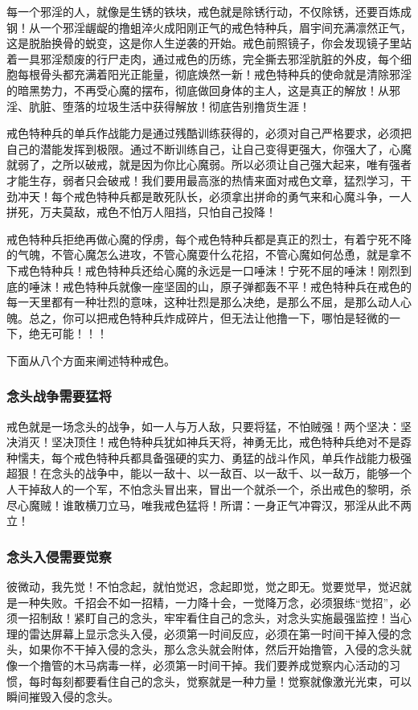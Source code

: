 每一个邪淫的人，就像是生锈的铁块，戒色就是除锈行动，不仅除锈，还要百炼成钢！从一个邪淫龌龊的撸蛆淬火成阳刚正气的戒色特种兵，眉宇间充满凛然正气，这是脱胎换骨的蜕变，这是你人生逆袭的开始。戒色前照镜子，你会发现镜子里站着一具邪淫颓废的行尸走肉，通过戒色的历练，完全撕去邪淫肮脏的外皮，每个细胞每根骨头都充满着阳光正能量，彻底焕然一新！戒色特种兵的使命就是清除邪淫的暗黑势力，不再受心魔的摆布，彻底做回身体的主人，这是真正的解放！从邪淫、肮脏、堕落的垃圾生活中获得解放！彻底告别撸货生涯！

戒色特种兵的单兵作战能力是通过残酷训练获得的，必须对自己严格要求，必须把自己的潜能发挥到极限。通过不断训练自己，让自己变得更强大，你强大了，心魔就弱了，之所以破戒，就是因为你比心魔弱。所以必须让自己强大起来，唯有强者才能生存，弱者只会破戒！我们要用最高涨的热情来面对戒色文章，猛烈学习，干劲冲天！每个戒色特种兵都是敢死队长，必须拿出拼命的勇气来和心魔斗争，一人拼死，万夫莫敌，戒色不怕万人阻挡，只怕自己投降！

戒色特种兵拒绝再做心魔的俘虏，每个戒色特种兵都是真正的烈士，有着宁死不降的气魄，不管心魔怎么进攻，不管心魔耍什么花招，不管心魔如何怂恿，就是拿不下戒色特种兵！戒色特种兵还给心魔的永远是一口唾沫！宁死不屈的唾沫！刚烈到底的唾沫！戒色特种兵就像一座坚固的山，原子弹都轰不平！戒色特种兵在戒色的每一天里都有一种壮烈的意味，这种壮烈是那么决绝，是那么不屈，是那么动人心魄。总之，你可以把戒色特种兵炸成碎片，但无法让他撸一下，哪怕是轻微的一下，绝无可能！！！

下面从八个方面来阐述特种戒色。

\subsubsection{念头战争需要猛将}

戒色就是一场念头的战争，如一人与万人敌，只要将猛，不怕贼强！两个坚决：坚决消灭！坚决顶住！戒色特种兵犹如神兵天将，神勇无比，戒色特种兵绝对不是孬种懦夫，每个戒色特种兵都具备强硬的实力、勇猛的战斗作风，单兵作战能力极强超狠！在念头的战争中，能以一敌十、以一敌百、以一敌千、以一敌万，能够一个人干掉敌人的一个军，不怕念头冒出来，冒出一个就杀一个，杀出戒色的黎明，杀尽心魔贼！谁敢横刀立马，唯我戒色猛将！所谓：一身正气冲霄汉，邪淫从此不两立！

\subsubsection{念头入侵需要觉察}

彼微动，我先觉！不怕念起，就怕觉迟，念起即觉，觉之即无。觉要觉早，觉迟就是一种失败。千招会不如一招精，一力降十会，一觉降万念，必须狠练“觉招”，必须一招制敌！紧盯自己的念头，牢牢看住自己的念头，对念头实施最强监控！当心理的雷达屏幕上显示念头入侵，必须第一时间反应，必须在第一时间干掉入侵的念头，如果你不干掉入侵的念头，那么念头就会附体，然后开始撸管，入侵的念头就像一个撸管的木马病毒一样，必须第一时间干掉。我们要养成觉察内心活动的习惯，每时每刻都要看住自己的念头，觉察就是一种力量！觉察就像激光光束，可以瞬间摧毁入侵的念头。

